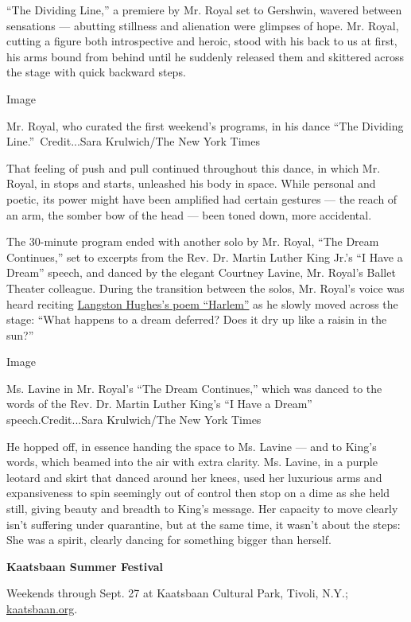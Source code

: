 ``The Dividing Line,'' a premiere by Mr. Royal set to Gershwin, wavered
between sensations --- abutting stillness and alienation were glimpses
of hope. Mr. Royal, cutting a figure both introspective and heroic,
stood with his back to us at first, his arms bound from behind until he
suddenly released them and skittered across the stage with quick
backward steps.

Image

Mr. Royal, who curated the first weekend's programs, in his dance ``The
Dividing Line.''~Credit...Sara Krulwich/The New York Times

That feeling of push and pull continued throughout this dance, in which
Mr. Royal, in stops and starts, unleashed his body in space. While
personal and poetic, its power might have been amplified had certain
gestures --- the reach of an arm, the somber bow of the head --- been
toned down, more accidental.

The 30-minute program ended with another solo by Mr. Royal, ``The Dream
Continues,'' set to excerpts from the Rev. Dr. Martin Luther King Jr.'s
``I Have a Dream'' speech, and danced by the elegant Courtney Lavine,
Mr. Royal's Ballet Theater colleague. During the transition between the
solos, Mr. Royal's voice was heard reciting
\href{https://www.poetryfoundation.org/poems/46548/harlem}{Langston
Hughes's poem ``Harlem''} as he slowly moved across the stage: ``What
happens to a dream deferred? Does it dry up like a raisin in the sun?''

Image

Ms. Lavine in Mr. Royal's ``The Dream Continues,'' which was danced to
the words of the Rev. Dr. Martin Luther King's ``I Have a Dream''
speech.Credit...Sara Krulwich/The New York Times

He hopped off, in essence handing the space to Ms. Lavine --- and to
King's words, which beamed into the air with extra clarity. Ms. Lavine,
in a purple leotard and skirt that danced around her knees, used her
luxurious arms and expansiveness to spin seemingly out of control then
stop on a dime as she held still, giving beauty and breadth to King's
message. Her capacity to move clearly isn't suffering under quarantine,
but at the same time, it wasn't about the steps: She was a spirit,
clearly dancing for something bigger than herself.

\textbf{Kaatsbaan Summer Festival}

Weekends through Sept. 27 at Kaatsbaan Cultural Park, Tivoli, N.Y.;
\href{https://kaatsbaan.org/spring-summer-events}{kaatsbaan.org}.

